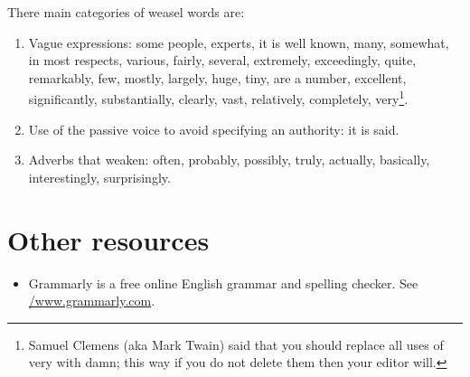 \documentclass[a4paper,12pt]{article}
\newcounter{foo}
\begin{document}
There main categories of weasel words are:
%
\begin{enumerate}
\item Vague expressions: some people, experts, it is well known, many,
  somewhat, in most respects, various, fairly, several, extremely,
  exceedingly, quite, remarkably, few, mostly, largely, huge, tiny,
  are a number, excellent, significantly, substantially, clearly,
  vast, relatively, completely, very\footnote{Samuel Clemens (aka Mark
    Twain) said that you should replace all uses of very with damn;
    this way if you do not delete them then your editor will.}.

\item Use of the passive voice to avoid specifying an authority: it is
  said.

\item Adverbs that weaken: often, probably, possibly, truly, actually,
  basically, interestingly, surprisingly.
\end{enumerate}


\section{Other resources}

\begin{itemize}
\item Grammarly is a free online English grammar and spelling checker.
  See \url{/www.grammarly.com}.
\end{itemize}
\end{document}
